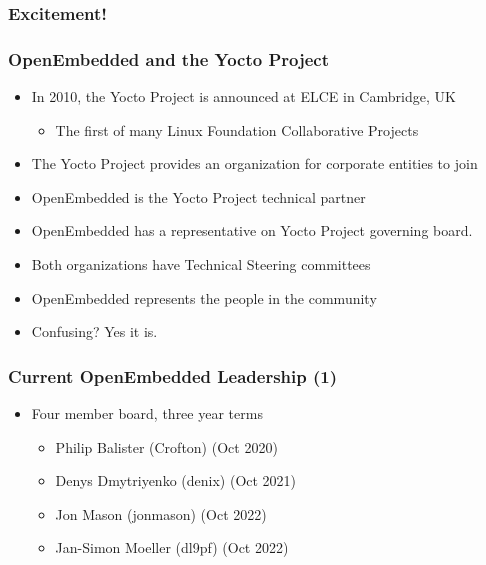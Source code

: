 \documentclass{beamer}
\begin{document}
\begin{frame}
	\frametitle{Excitement!}


\end{frame}
\begin{frame}

	\frametitle{OpenEmbedded and the Yocto Project}

\begin{itemize}
\item In 2010, the Yocto Project is announced at ELCE in Cambridge, UK
\begin{itemize}
	\item The first of many Linux Foundation Collaborative Projects
\end{itemize}
\item The Yocto Project provides an organization for corporate entities to join
\item OpenEmbedded is the Yocto Project technical partner
\item OpenEmbedded has a representative on Yocto Project governing board.
\item Both organizations have Technical Steering committees
\item OpenEmbedded represents the people in the community
\item Confusing? Yes it is.
\end{itemize}

\end{frame}


\begin{frame}
	\frametitle{Current OpenEmbedded Leadership (1)}

	\begin{itemize}
		\item Four member board, three year terms
			\begin{itemize}
				\item Philip Balister (Crofton) (Oct 2020)
				\item Denys Dmytriyenko (denix) (Oct 2021)
				\item Jon Mason (jonmason) (Oct 2022)
				\item Jan-Simon Moeller (dl9pf) (Oct 2022)
			\end{itemize}
	\end{itemize}
\end{frame}
\end{document}
